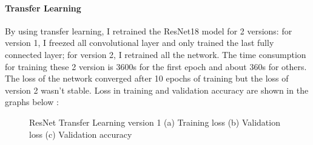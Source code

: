 \documentclass[runningheads]{llncs}
\begin{document}
\paragraph{\bf Transfer Learning} 
By using transfer learning, I retrained the ResNet18 model for 2 versions: for version 1, I freezed all convolutional layer and only trained the last fully connected layer; for version 2, I retrained all the network. The time consumption for training these 2 version is 3600s for the first epoch and about 360s for others. The loss of the network converged after 10 epochs of training but the loss of version 2 wasn't stable. Loss in training and validation accuracy are shown in the graphs below :
\begin{figure}[H]
    \centering
    \caption{ResNet Transfer Learning version 1 (a) Training loss (b) Validation loss (c) Validation accuracy}
    \label{fig:resnet1}
\end{figure}
\end{document}
